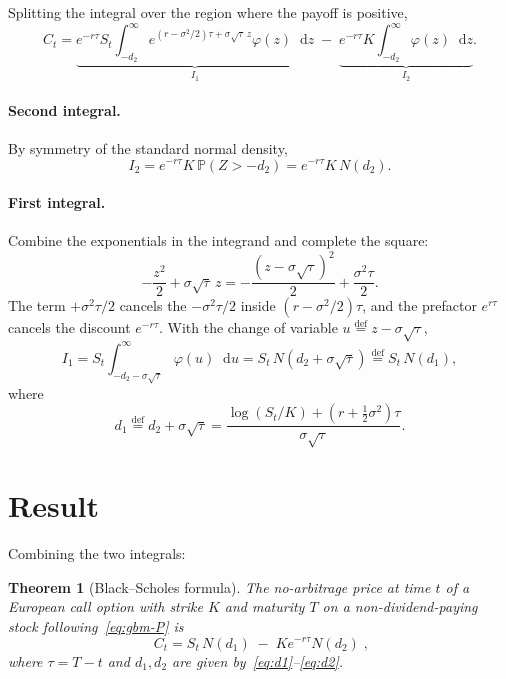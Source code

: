 \documentclass[11pt,a4paper]{article}
\theoremstyle{plain}
\newtheorem{theorem}{Theorem}[section]
\theoremstyle{definition}
\theoremstyle{remark}
\newcommand{\Prob}{\mathbb{P}}
\newcommand{\dd}{\mathop{}\!\mathrm{d}}
\newcommand{\eqdef}{\overset{\mathrm{def}}{=}}
\begin{document}
Splitting the integral over the region where the payoff is positive,
\begin{equation}
    C_t
    = \underbrace{
        e^{-r\tau} S_t
        \int_{-d_2}^{\infty}
            e^{(r - \sigma^2/2)\tau + \sigma\sqrt{\tau}\, z}
            \varphi(z) \dd z
      }_{I_1}
      \;-\;
      \underbrace{
        e^{-r\tau} K
        \int_{-d_2}^{\infty}\!\varphi(z) \dd z
      }_{I_2}.
    \label{eq:split}
\end{equation}

\paragraph{Second integral.} By symmetry of the standard normal density,
\[
    I_2 = e^{-r\tau} K\, \Prob(Z > -d_2)
        = e^{-r\tau} K\, N(d_2).
\]

\paragraph{First integral.} Combine the exponentials in the integrand and
complete the square:
\[
    -\frac{z^2}{2} + \sigma\sqrt{\tau}\, z
    = -\frac{(z - \sigma\sqrt{\tau})^2}{2} + \frac{\sigma^2 \tau}{2}.
\]
The term \(+\sigma^2 \tau / 2\) cancels the \(-\sigma^2 \tau / 2\)
inside \((r - \sigma^2/2)\tau\), and the prefactor \(e^{r\tau}\) cancels
the discount \(e^{-r\tau}\). With the change of variable
\(u \eqdef z - \sigma\sqrt{\tau}\),
\[
    I_1
    = S_t \int_{-d_2 - \sigma\sqrt{\tau}}^{\infty}\!\varphi(u) \dd u
    = S_t\, N\!\left(d_2 + \sigma\sqrt{\tau}\right)
    \eqdef S_t\, N(d_1),
\]
where
\begin{equation}
    d_1 \eqdef d_2 + \sigma\sqrt{\tau}
        = \frac{\log(S_t/K) + (r + \tfrac{1}{2}\sigma^2)\tau}
               {\sigma \sqrt{\tau}}.
    \label{eq:d1}
\end{equation}

\section{Result}

Combining the two integrals:

\begin{theorem}[Black--Scholes formula]
The no-arbitrage price at time \(t\) of a European call option with
strike \(K\) and maturity \(T\) on a non-dividend-paying stock
following~\eqref{eq:gbm-P} is
\begin{equation}
    \boxed{\;
        C_t
        = S_t\, N(d_1) \;-\; K e^{-r\tau} N(d_2)
    \;},
    \label{eq:bs}
\end{equation}
where \(\tau = T - t\) and \(d_1, d_2\) are given
by~\eqref{eq:d1}--\eqref{eq:d2}.
\end{theorem}
\end{document}
